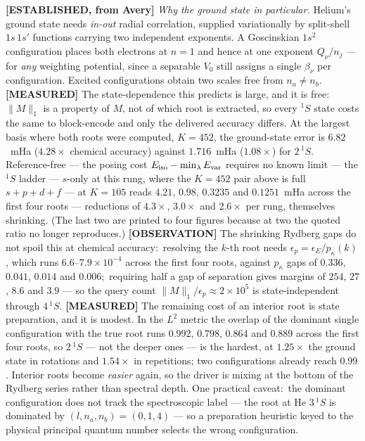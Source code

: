 \documentclass[aps,pra,twocolumn,superscriptaddress,longbibliography]{revtex4-2}
\newcommand{\gvq}[2]{#2}
\begin{document}
\textbf{[ESTABLISHED, from Avery]} \emph{Why the ground state in particular.}
Helium's ground state needs \emph{in-out} radial correlation, supplied
variationally by split-shell $1s\,1s'$ functions carrying two independent
exponents.  A Goscinskian $1s^{2}$ configuration places both electrons at $n=1$
and hence at one exponent $Q_\nu/n_j$ --- for \emph{any} weighting potential,
since a separable $V_0$ still assigns a single $\beta_\nu$ per configuration.
Excited configurations obtain two scales free from $n_a\neq n_b$.
\textbf{[MEASURED]} The state-dependence this predicts is large, and it is free:
$\|M\|_1$ is a property of $M$, not of which root is extracted, so every $^{1}S$
state costs the same to block-encode and only the delivered accuracy differs.
At the largest basis where both roots were computed, $K=452$, the ground-state error is
$\gvq{p60_gnd_gap_k452}{6.82}$~mHa ($4.28\times$ chemical accuracy) against
$\gvq{p60_exc_gap_k452}{1.716}$~mHa ($1.08\times$) for $2\,^{1}S$.  Reference-free --- the posing cost
$E_{\rm iso}-\min_\lambda E_{\rm var}$ requires no known limit --- the $^{1}S$
ladder --- $s$-only at this rung, where the $K=452$ pair above is full
$s\!+\!p\!+\!d\!+\!f$ --- at $K=105$ reads $\gvq{p60_posing_cost_ground}{4.21}$,
$\gvq{p60_posing_cost_exc}{0.98}$, $0.3235$ and $0.1251$~mHa across the first
four roots --- reductions of $4.3\times$, $3.0\times$ and $2.6\times$ per rung,
themselves shrinking.  (The last two are printed to four figures because at two
the quoted ratio no longer reproduces.)
\textbf{[OBSERVATION]} The shrinking Rydberg gaps do not spoil this at chemical
accuracy:\ resolving the $k$-th root needs
$\epsilon_p=\epsilon_E/p_\kappa(k)$, which runs $6.6$--$7.9\times10^{-4}$ across
the first four roots, against $p_\kappa$ gaps of $0.336$, $0.041$, $0.014$ and
$0.006$;\ requiring half a gap of separation gives margins of $254$, $27$,
$8.6$ and $3.9$ --- so
the query count $\|M\|_1/\epsilon_p\approx2\times10^{5}$ is state-independent
through $4\,^{1}S$.  \textbf{[MEASURED]} The remaining cost of an interior root
is state preparation, and it is modest.  In the $L^{2}$ metric the overlap of the
dominant single configuration with the true root runs $0.992$, $
\gvq{p60_stateprep_overlap_exc}{0.798}$, $0.864$ and $0.889$ across the first
four roots, so $2\,^{1}S$ --- not the deeper ones --- is the hardest, at
$1.25\times$ the ground state in rotations and $1.54\times$ in repetitions;  two
configurations already reach $0.99$.  Interior roots become \emph{easier} again,
so the driver is mixing at the bottom of the Rydberg series rather than spectral
depth.  One practical caveat:\ the dominant configuration does not track the
spectroscopic label --- the root at He $3\,^{1}S$ is dominated by
$(l,n_a,n_b)=(0,1,4)$ --- so a preparation heuristic keyed to the physical
principal quantum number selects the wrong configuration.
\end{document}
